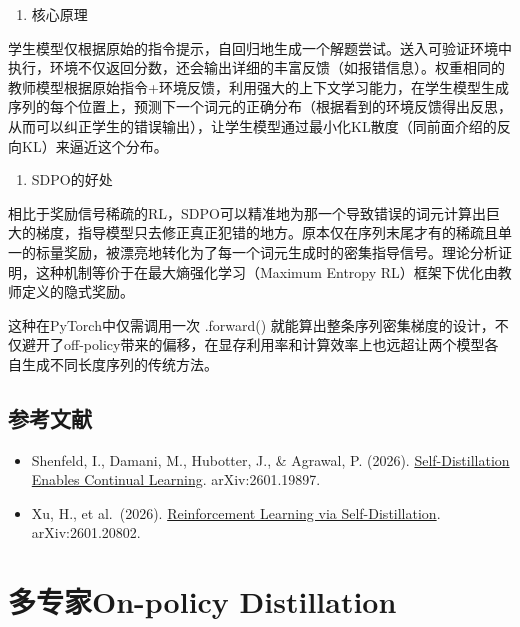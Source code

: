 \begin{enumerate}
\def\labelenumi{\arabic{enumi}.}
\setcounter{enumi}{1}
\tightlist
\item
  核心原理
\end{enumerate}

学生模型仅根据原始的指令提示，自回归地生成一个解题尝试。送入可验证环境中执行，环境不仅返回分数，还会输出详细的丰富反馈（如报错信息）。权重相同的教师模型根据原始指令+环境反馈，利用强大的上下文学习能力，在学生模型生成序列的每个位置上，预测下一个词元的正确分布（根据看到的环境反馈得出反思，从而可以纠正学生的错误输出），让学生模型通过最小化KL散度（同前面介绍的反向KL）来逼近这个分布。

\begin{enumerate}
\def\labelenumi{\arabic{enumi}.}
\setcounter{enumi}{2}
\tightlist
\item
  SDPO的好处
\end{enumerate}

相比于奖励信号稀疏的RL，SDPO可以精准地为那一个导致错误的词元计算出巨大的梯度，指导模型只去修正真正犯错的地方。原本仅在序列末尾才有的稀疏且单一的标量奖励，被漂亮地转化为了每一个词元生成时的密集指导信号。理论分析证明，这种机制等价于在最大熵强化学习（Maximum Entropy RL）框架下优化由教师定义的隐式奖励。

这种在PyTorch中仅需调用一次 .forward() 就能算出整条序列密集梯度的设计，不仅避开了off-policy带来的偏移，在显存利用率和计算效率上也远超让两个模型各自生成不同长度序列的传统方法。

\hypertarget{ux53c2ux8003ux6587ux732e-103}{%
\subsection{参考文献}\label{ux53c2ux8003ux6587ux732e-103}}

\begin{itemize}
\tightlist
\item
  Shenfeld, I., Damani, M., Hubotter, J., \& Agrawal, P. (2026). \href{https://arxiv.org/abs/2601.19897}{Self-Distillation Enables Continual Learning}. arXiv:2601.19897.
\item
  Xu, H., et al.~(2026). \href{https://arxiv.org/abs/2601.20802}{Reinforcement Learning via Self-Distillation}. arXiv:2601.20802.
\end{itemize}

\clearpage

\hypertarget{ux591aux4e13ux5bb6on-policy-distillation}{%
\section{多专家On-policy Distillation}\label{ux591aux4e13ux5bb6on-policy-distillation}}

